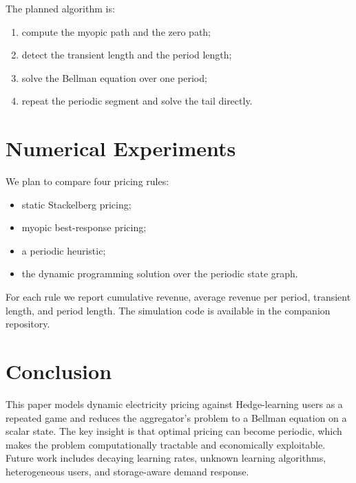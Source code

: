 \documentclass[conference]{IEEEtran}
\begin{document}
The planned algorithm is:
\begin{enumerate}
    \item compute the myopic path and the zero path;
    \item detect the transient length and the period length;
    \item solve the Bellman equation over one period;
    \item repeat the periodic segment and solve the tail directly.
\end{enumerate}

\section{Numerical Experiments}
We plan to compare four pricing rules:
\begin{itemize}
    \item static Stackelberg pricing;
    \item myopic best-response pricing;
    \item a periodic heuristic;
    \item the dynamic programming solution over the periodic state graph.
\end{itemize}
For each rule we report cumulative revenue, average revenue per period, transient length, and period length. The simulation code is available in the companion repository.

\section{Conclusion}
This paper models dynamic electricity pricing against Hedge-learning users as a repeated game and reduces the aggregator's problem to a Bellman equation on a scalar state. The key insight is that optimal pricing can become periodic, which makes the problem computationally tractable and economically exploitable. Future work includes decaying learning rates, unknown learning algorithms, heterogeneous users, and storage-aware demand response.



\end{document}
